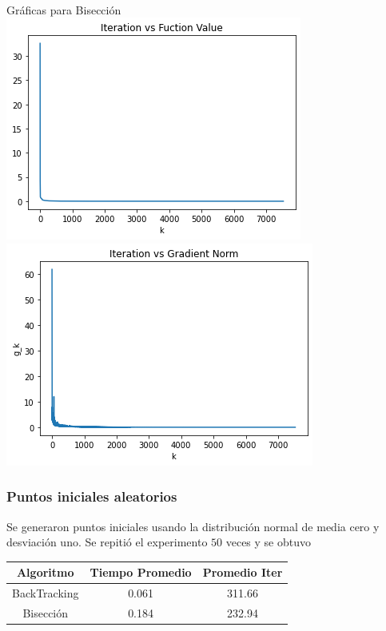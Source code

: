 \documentclass[11pt,letterpaper]{article}
\theoremstyle{definition}
\theoremstyle{definition}
\theoremstyle{definition}
\begin{document}
\begin{center}
	\\
	Gráficas para Bisección
	\\
	\includegraphics[width=0.8\linewidth]{graficas/wood_bisection_f}
	\\
	\includegraphics[width=0.8\linewidth]{graficas/wood_bisection_g}
\end{center}
\subsubsection{Puntos iniciales aleatorios}
Se generaron puntos iniciales usando la distribución normal de media cero y desviación uno. Se repitió el experimento $ 50 $ veces y se obtuvo
\begin{center}
	\begin{tabular}{ccc}
		\hline
		Algoritmo & Tiempo Promedio & Promedio Iter \\
		\hline
		BackTracking & 0.061 & 311.66 \\
		Bisección    & 0.184 & 232.94 \\
		\hline
	\end{tabular}
\end{center}
\end{document}
